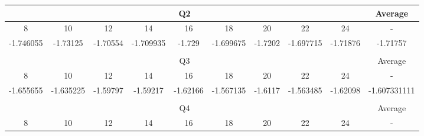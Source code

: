 \documentclass[10pt,a4paper]{article}
\begin{document}
\begin{table}[h]
\centering
\begin{adjustbox}{width=1\textwidth}
\begin{tabular}{cccccccccc}
\hline
\multicolumn{9}{|c|}{Q2} & \multicolumn{1}{c|}{Average} \\ \hline
\multicolumn{1}{|c|}{8} & \multicolumn{1}{c|}{10} & \multicolumn{1}{c|}{12} & \multicolumn{1}{c|}{14} & \multicolumn{1}{c|}{16} & \multicolumn{1}{c|}{18} & \multicolumn{1}{c|}{20} & \multicolumn{1}{c|}{22} & \multicolumn{1}{c|}{24} & \multicolumn{1}{c|}{-} \\ \hline
\multicolumn{1}{|c|}{-1.746055} & \multicolumn{1}{c|}{-1.73125} & \multicolumn{1}{c|}{-1.70554} & \multicolumn{1}{c|}{-1.709935} & \multicolumn{1}{c|}{-1.729} & \multicolumn{1}{c|}{-1.699675} & \multicolumn{1}{c|}{-1.7202} & \multicolumn{1}{c|}{-1.697715} & \multicolumn{1}{c|}{-1.71876} & \multicolumn{1}{c|}{-1.71757} \\ \hline
\multicolumn{1}{l}{} & \multicolumn{1}{l}{} & \multicolumn{1}{l}{} & \multicolumn{1}{l}{} & \multicolumn{1}{l}{} & \multicolumn{1}{l}{} & \multicolumn{1}{l}{} & \multicolumn{1}{l}{} & \multicolumn{1}{l}{} & \multicolumn{1}{l}{} \\ \hline
\multicolumn{9}{|c|}{Q3} & \multicolumn{1}{c|}{Average} \\ \hline
\multicolumn{1}{|c|}{8} & \multicolumn{1}{c|}{10} & \multicolumn{1}{c|}{12} & \multicolumn{1}{c|}{14} & \multicolumn{1}{c|}{16} & \multicolumn{1}{c|}{18} & \multicolumn{1}{c|}{20} & \multicolumn{1}{c|}{22} & \multicolumn{1}{c|}{24} & \multicolumn{1}{c|}{-} \\ \hline
\multicolumn{1}{|c|}{-1.655655} & \multicolumn{1}{c|}{-1.635225} & \multicolumn{1}{c|}{-1.59797} & \multicolumn{1}{c|}{-1.59217} & \multicolumn{1}{c|}{-1.62166} & \multicolumn{1}{c|}{-1.567135} & \multicolumn{1}{c|}{-1.6117} & \multicolumn{1}{c|}{-1.563485} & \multicolumn{1}{c|}{-1.62098} & \multicolumn{1}{c|}{-1.607331111} \\ \hline
\multicolumn{1}{l}{} & \multicolumn{1}{l}{} & \multicolumn{1}{l}{} & \multicolumn{1}{l}{} & \multicolumn{1}{l}{} & \multicolumn{1}{l}{} & \multicolumn{1}{l}{} & \multicolumn{1}{l}{} & \multicolumn{1}{l}{} & \multicolumn{1}{l}{} \\ \hline
\multicolumn{9}{|c|}{Q4} & \multicolumn{1}{c|}{Average} \\ \hline
\multicolumn{1}{|c|}{8} & \multicolumn{1}{c|}{10} & \multicolumn{1}{c|}{12} & \multicolumn{1}{c|}{14} & \multicolumn{1}{c|}{16} & \multicolumn{1}{c|}{18} & \multicolumn{1}{c|}{20} & \multicolumn{1}{c|}{22} & \multicolumn{1}{c|}{24} & \multicolumn{1}{c|}{-} \\ \hline

\end{tabular}
\end{adjustbox}
\end{table}
\end{document}
